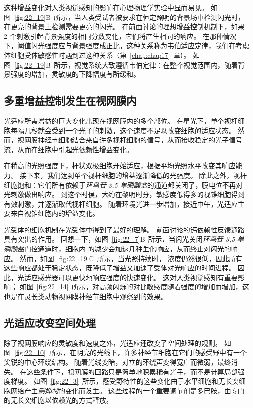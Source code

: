 这种增益变化对人类视觉感知的影响在心理物理学实验中显而易见。
如图~\ref{fig:22_19}B~所示，当人类受试者被要求在恒定照明的背景场中检测闪光时，在更亮的背景上检测需要更亮的闪光。
在前面讨论的理想增益控制机制下，如果 2 个刺激引起背景强度的相同分数变化，它们将产生相同的响应。
在那种情况下，阈值闪光强度应与背景强度成正比，这种关系称为韦伯适应定律，我们在考虑体细胞受体敏感性时遇到过这种关系（第~\ref{chap:chap17}~章）。
如图~\ref{fig:22_19}B~所示，视觉系统大致遵循韦伯定律：在整个视觉范围内，随着背景强度的增加，灵敏度的下降幅度有所缓和。



\subsection{多重增益控制发生在视网膜内}

光适应所需增益的巨大变化出现在视网膜内的多个部位。 
在星光下，单个视杆细胞每隔几秒就会受到一个光子的刺激，这个速度不足以改变细胞的适应状态。
然而，视网膜神经节细胞结合来自许多视杆细胞的信号，从而接收稳定的光子信号流，从而在细胞中引起光依赖性增益变化。


在稍高的光照强度下，杆状双极细胞开始适应，根据平均光照水平改变其响应能力。
接下来，我们达到单个视杆细胞的增益逐渐降低的光强度。
除此之外，视杆细胞饱和：它们所有依赖于\textit{环鸟苷-3,5-单磷酸盐}的通道都关闭了，膜电位不再对光刺激做出响应。
到这个时候，大约在黎明时分，敏感度低得多的视锥细胞得到有效刺激，并逐渐取代视杆细胞。
随着环境光进一步增加，接近中午，光适应主要来自视锥细胞内的增益变化。


光受体的细胞机制在光受体中得到了最好的理解。
前面讨论的钙依赖性反馈通路具有突出的作用。
回想一下，如图~\ref{fig:22_7}B~所示，当闪光关闭\textit{环鸟苷-3,5-单磷酸盐}门控通道时，细胞内  的减少会加速几种生化响应，从而终止对闪光的响应。
然而，如图~\ref{fig:22_19}C~所示，当光照持续时， 浓度仍然很低，因此所有这些响应都处于稳定状态，既降低了增益又加速了受体对光响应的时间进程。
因此，光适应感光器可以更快地响应强度的快速变化。
这对人类视觉感知有重要影响；
如图~\ref{fig:22_14}~所示，对高频闪烁的对比敏感度随着强度的增加而增加，这也是在灵长类动物视网膜神经节细胞中观察到的效果。



\subsection{光适应改变空间处理}

除了视网膜响应的灵敏度和速度之外，光适应还改变了空间处理的规则。
如图~\ref{fig:22_10}~所示，在明亮的光线下，许多神经节细胞在它们的感受野中有一个尖锐的中心环绕结构。 
随着光线变暗，对立的环绕声变得宽广而微弱，最终消失。
在这些条件下，视网膜的回路只是简单地积累稀有光子，而不是计算局部强度梯度。
如图~\ref{fig:22_3}~所示，感受野特性的这些变化由于水平细胞和无长突细胞网络产生\textit{侧抑制}的变化而发生。
这些过程的一个重要调节剂是多巴胺，由专门的无长突细胞以依赖光的方式释放。


